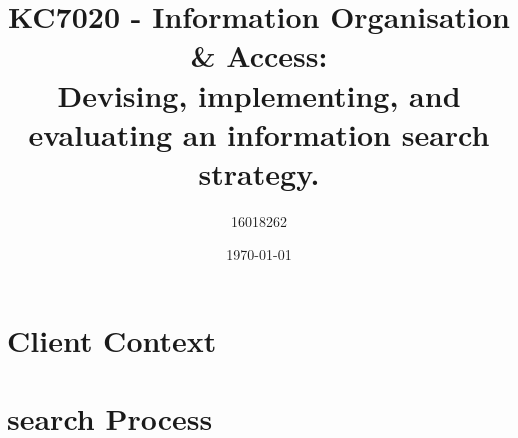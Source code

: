 \documentclass[10pt]{article}
\title{KC7020 - Information Organisation \& Access: \\ Devising, implementing, and evaluating an information search strategy.\\
}
\author{16018262}
\date{\today}
\begin{document}
\maketitle
\begin{center}

\end{center}
\tableofcontents
\section{Client Context}

\section{search Process}

\appendix

\printbibliography
\end{document}
